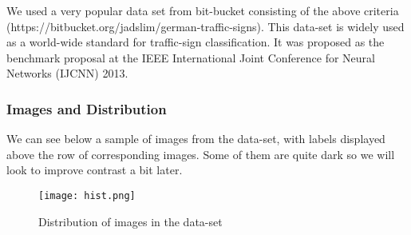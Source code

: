 We used a very popular data set from bit-bucket consisting of the above criteria (https://bitbucket.org/jadslim/german-traffic-signs). This data-set is widely used as a world-wide standard for traffic-sign classification. It was proposed as the benchmark proposal at the IEEE International Joint Conference for Neural Networks (IJCNN) 2013.

\subsubsection{Images and Distribution}
We can see below a sample of images from the data-set, with labels displayed above the row of corresponding images. Some of them are quite dark so we will look to improve contrast a bit later.
\begin{figure}[H]
	\centering
	\texttt{[image: hist.png]}
	\caption{Distribution of images in the data-set}
\end{figure}

